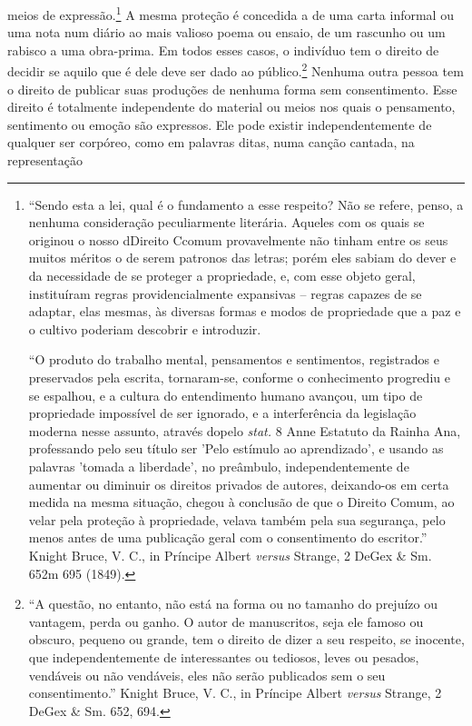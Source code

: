 meios de expressão.\footnote{``Sendo esta a lei, qual é o fundamento a
  esse respeito? Não se refere, penso, a nenhuma consideração
  peculiarmente literária. Aqueles com os quais se originou o nosso
  dDireito Ccomum provavelmente não tinham entre os seus muitos méritos
  o de serem patronos das letras; porém eles sabiam do dever e da
  necessidade de se proteger a propriedade, e, com esse objeto geral,
  instituíram regras providencialmente expansivas -- regras capazes de
  se adaptar, elas mesmas, às diversas formas e modos de propriedade que
  a paz e o cultivo poderiam descobrir e introduzir.

  ``O produto do trabalho mental, pensamentos e sentimentos, registrados
  e preservados pela escrita, tornaram-se, conforme o conhecimento
  progrediu e se espalhou, e a cultura do entendimento humano avançou,
  um tipo de propriedade impossível de ser ignorado, e a interferência
  da legislação moderna nesse assunto, através dopelo \emph{stat.} 8
  Anne Estatuto da Rainha Ana, professando pelo seu título ser 'Pelo
  estímulo ao aprendizado', e usando as palavras 'tomada a liberdade',
  no preâmbulo, independentemente de aumentar ou diminuir os direitos
  privados de autores, deixando-os em certa medida na mesma situação,
  chegou à conclusão de que o Direito Comum, ao velar pela proteção à
  propriedade, velava também pela sua segurança, pelo menos antes de uma
  publicação geral com o consentimento do escritor.'' Knight Bruce, V.
  C., in Príncipe Albert \emph{versus} Strange, 2 DeGex \& Sm. 652m 695
  (1849).} A mesma proteção é concedida a de uma carta informal ou uma
nota num diário ao mais valioso poema ou ensaio, de um rascunho ou um
rabisco a uma obra-prima. Em todos esses casos, o indivíduo tem o
direito de decidir se aquilo que é dele deve ser dado ao
público.\footnote{``A questão, no entanto, não está na forma ou no
  tamanho do prejuízo ou vantagem, perda ou ganho. O autor de
  manuscritos, seja ele famoso ou obscuro, pequeno ou grande, tem o
  direito de dizer a seu respeito, se inocente, que independentemente de
  interessantes ou tediosos, leves ou pesados, vendáveis ou não
  vendáveis, eles não serão publicados sem o seu consentimento.'' Knight
  Bruce, V. C., in Príncipe Albert \emph{versus} Strange, 2 DeGex \& Sm.
  652, 694.} Nenhuma outra pessoa tem o direito de publicar suas
produções de nenhuma forma sem consentimento. Esse direito é totalmente
independente do material ou meios nos quais o pensamento, sentimento ou
emoção são expressos. Ele pode existir independentemente de qualquer ser
corpóreo, como em palavras ditas, numa canção cantada, na representação

